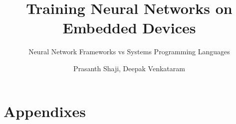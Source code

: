 \documentclass[a4paper]{UUThesisTemplate}
\author{Prasanth Shaji, Deepak Venkataram}
\title{Training Neural Networks on Embedded Devices}
\subtitle{Neural Network Frameworks vs Systems Programming Languages}
\begin{document}
\frontmatter
	\frontmatterCS



	\begingroup
		\tableofcontents
	\endgroup


\mainmatter
	
	
	

\backmatter
	\nocite{*} %
	
	

	\part{Appendixes}
	
\end{document}
